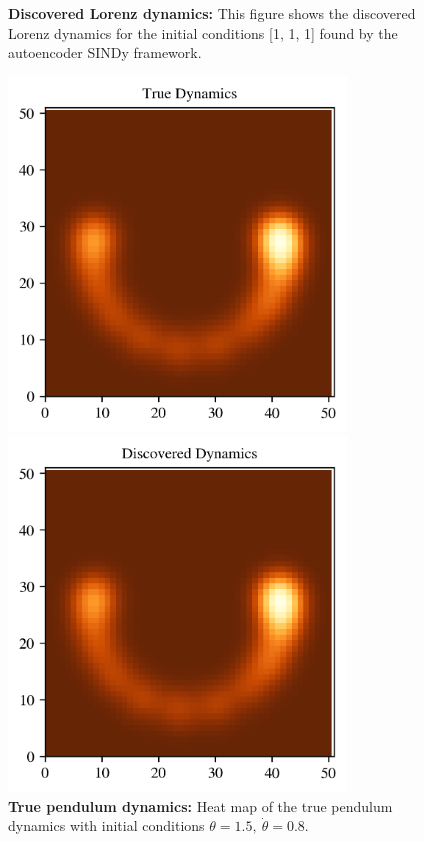 \begin{figure}[t]
\begin{minipage}[b]{.45\textwidth}
\caption{\textbf{Discovered Lorenz dynamics:} This figure shows the discovered Lorenz dynamics for the initial conditions [1, 1, 1] found by the autoencoder SINDy framework.}
\label{fig:lorenz_discovered_dynamics}
\end{minipage}
\end{figure}

\begin{figure}[t]
\centering
\begin{minipage}[b]{.45\textwidth}
\centering
    \includegraphics[width=0.8\textwidth]{project_2/images/true_heatmap_pendulum.png}
    \caption{\textbf{True pendulum dynamics:} Heat map of the true pendulum dynamics with initial conditions $\theta=1.5,\ \dot{\theta}=0.8$.}
    \label{fig:true_heatmap_pendulum}
\end{minipage}\qquad\quad
\begin{minipage}[b]{.45\textwidth}
\centering
    \includegraphics[width=0.8\textwidth]{project_2/images/discovered_heatmap_pendulum.png}

\end{minipage}
\end{figure}
